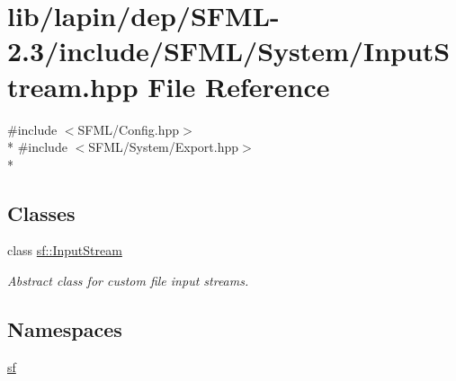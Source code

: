 \hypertarget{lapin_2dep_2_s_f_m_l-2_83_2include_2_s_f_m_l_2_system_2_input_stream_8hpp}{\section{lib/lapin/dep/\-S\-F\-M\-L-\/2.3/include/\-S\-F\-M\-L/\-System/\-Input\-Stream.hpp File Reference}
\label{lapin_2dep_2_s_f_m_l-2_83_2include_2_s_f_m_l_2_system_2_input_stream_8hpp}
}
{\ttfamily \#include $<$S\-F\-M\-L/\-Config.\-hpp$>$}\\*
{\ttfamily \#include $<$S\-F\-M\-L/\-System/\-Export.\-hpp$>$}\\*
\subsection*{Classes}
\begin{DoxyCompactItemize}
\item 
class \hyperlink{classsf_1_1_input_stream}{sf\-::\-Input\-Stream}
\begin{DoxyCompactList}\small\item\em Abstract class for custom file input streams. \end{DoxyCompactList}\end{DoxyCompactItemize}
\subsection*{Namespaces}
\begin{DoxyCompactItemize}
\item 
\hyperlink{namespacesf}{sf}
\end{DoxyCompactItemize}
